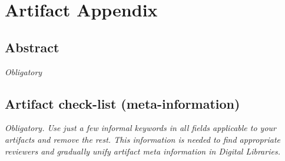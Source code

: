 \documentclass{sigplanconf}
\begin{document}


\appendix
\section{Artifact Appendix}

\subsection{Abstract}

{\em Obligatory}

\subsection{Artifact check-list (meta-information)}

{\em Obligatory. Use just a few informal keywords in all fields applicable to your artifacts
and remove the rest. This information is needed to find appropriate reviewers and gradually 
unify artifact meta information in Digital Libraries.}
\end{document}
